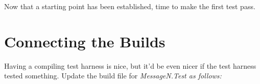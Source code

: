 

Now that a starting point has been established, time to make the first test pass.

\section{Connecting the Builds}

Having a compiling test harness is nice, but it'd be even nicer if the test harness tested something. Update the build file for \em MessageN.Test \em as follows:

